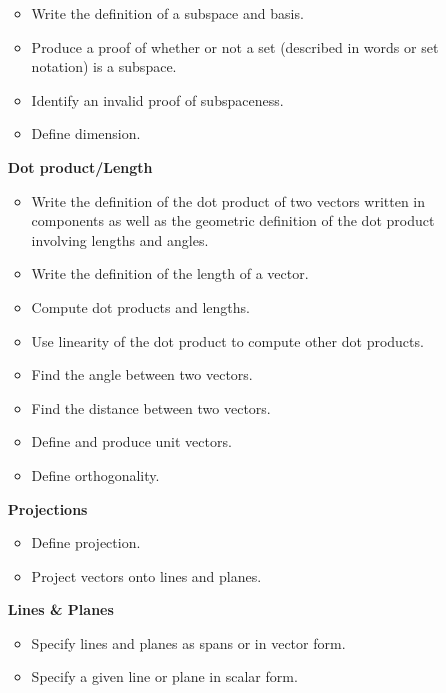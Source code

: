\documentclass[letter]{article}
\begin{document}
\begin{enumerate}
			\begin{itemize}
				\item Write the definition of a subspace and basis.
				\item Produce a proof of whether or not a set (described in words or set notation) is
					a subspace.
				\item Identify an invalid proof of subspaceness.
				\item Define dimension.
			\end{itemize}
		\item[\bf Dot product/Length] 
			\begin{itemize}
				\item Write the definition of the dot product of two vectors written in components as well as 
					the geometric definition of the dot product involving lengths and angles.
				\item Write the definition of the length of a vector.
				\item Compute dot products and lengths.
				\item Use linearity of the dot product to compute other dot products.
				\item Find the angle between two vectors.
				\item Find the distance between two vectors.
				\item Define and produce unit vectors.
				\item Define orthogonality.
			\end{itemize}
		\item[\bf Projections] 
			\begin{itemize}
				\item Define projection.
				\item Project vectors onto lines and planes.
			\end{itemize}
		\item[\bf Lines \& Planes] 
			\begin{itemize}
				\item Specify lines and planes as spans or in vector form.
				\item Specify a given line or plane in scalar form.
			\end{itemize}
	\end{enumerate}
\end{document}
